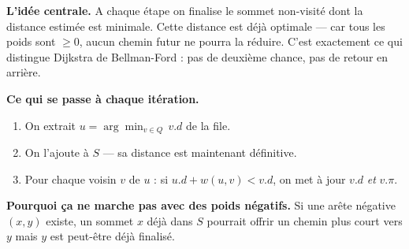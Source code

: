 \documentclass[11pt,a4paper,openany]{book}
\begin{document}
\begin{exbox}[title=Ce qu'il faut retenir]
\small\raggedright

\textbf{L'idée centrale.}
A chaque étape on finalise le sommet non-visité dont la distance
estimée est minimale. Cette distance est déjà optimale — car tous les poids sont
$\geq 0$, aucun chemin futur ne pourra la réduire.
C'est exactement ce qui distingue Dijkstra de Bellman-Ford : pas de deuxième chance,
pas de retour en arrière.

\textbf{Ce qui se passe à chaque itération.}
\begin{enumerate}
  \item On extrait $u = \arg\min_{v \in Q}\, v.d$ de la file.
  \item On l'ajoute à $S$ — sa distance est maintenant définitive.
  \item Pour chaque voisin $v$ de $u$ : si $u.d + w(u,v) < v.d$, on met à jour
        $v.d$ \emph{et} $v.\pi$.
\end{enumerate}

\textbf{Pourquoi ça ne marche pas avec des poids négatifs.}
Si une arête négative $(x, y)$ existe, un sommet $x$ déjà dans $S$ pourrait offrir un
chemin plus court vers $y$ mais $y$ est peut-être déjà finalisé.

\end{exbox}
\end{document}
